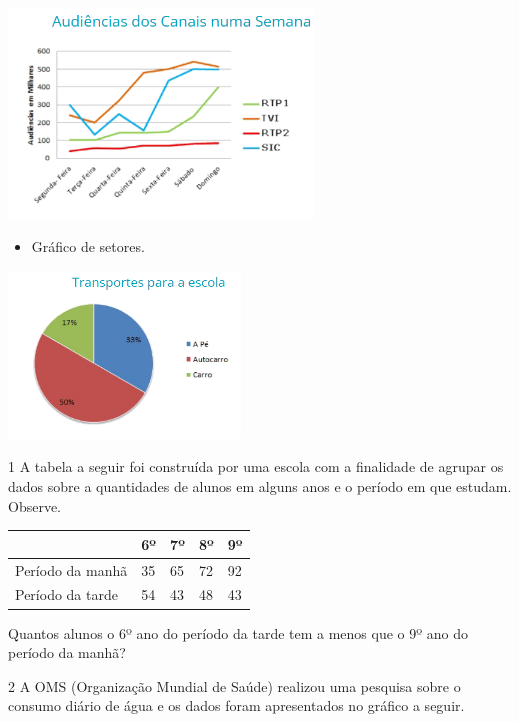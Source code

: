 \begin{mdframed}[linewidth=2pt,linecolor=salmao,roundcorner=2pt]
\begin{escolha}
{{\includegraphics[width=3.19872in,height=2.19483in]{media/image93.png}

\begin{itemize}
\item
  Gráfico de setores.
\end{itemize}

\includegraphics[width=2.42308in,height=1.74971in]{media/image94.png}
}


\num{1} A tabela a seguir foi construída por uma escola com a finalidade de agrupar os
dados sobre a quantidades de alunos em alguns anos e o período em que
estudam. Observe.

\begin{longtable}[]{@{}lllll@{}}
\toprule
& 6º & 7º & 8º & 9º\tabularnewline
\midrule
\endhead
Período da manhã & 35 & 65 & 72 & 92\tabularnewline
Período da tarde & 54 & 43 & 48 & 43\tabularnewline
\bottomrule
\end{longtable}

Quantos alunos o 6º ano do período da tarde tem a menos que o 9º
ano do período da manhã?

\begin{mdframed}[linewidth=2pt,linecolor=salmao,roundcorner=2pt]
\vspace{2cm}
\end{mdframed}

\num{2} A OMS (Organização Mundial de Saúde) realizou uma pesquisa sobre o
consumo diário de água e os dados foram apresentados no gráfico a seguir.

}
\end{escolha}
\end{mdframed}
